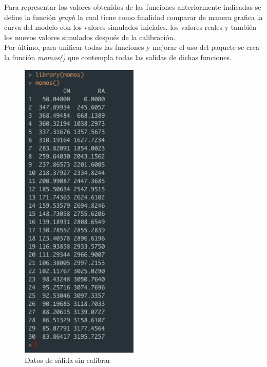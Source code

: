 Para representar los valores obtenidos de las funciones anteriormente indicadas se define la funci\'on \textit{graph} la cual tiene como finalidad comparar de manera grafica la curva del modelo con los valores simulados iniciales, los valores reales y tambi\'en los nuevos valores simulados despu\'es de la calibraci\'on.\\

Por \'ultimo, para unificar todas las funciones y mejorar el uso del paquete se crea la funci\'on \textit{momos()} que contempla todas las salidas de dichas funciones.

\begin{figure}[H]
    \centering
      \begin{minipage}{0.75\textwidth}
        \centering
        \includegraphics[width=0.5\textwidth]{figure_4_7.png}
        \caption{Datos de s\'alida sin calibrar}
        \label{fig:Fig}
      \end{minipage}%
      \hspace{5mm}
\end{figure}

